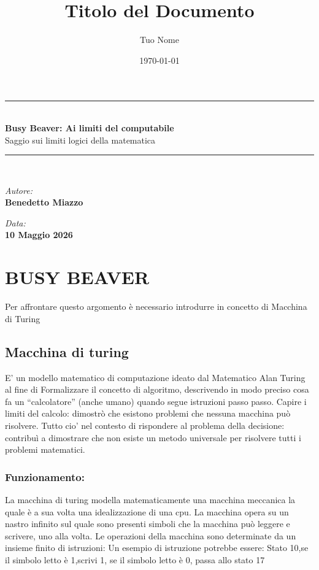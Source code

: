 \documentclass[12pt, a4paper, oneside]{article}
\begin{document}
\title{\textbf{Titolo del Documento}}
\author{Tuo Nome}
\date{\today}

\begin{center}
    \rule{\textwidth}{0.4pt} \\ [0.4cm]
    {\huge \bfseries Busy Beaver: Ai limiti del computabile} \\ [0.2cm]
    {\large Saggio sui limiti logici della matematica} \\ [0.2cm]
    \rule{\textwidth}{0.4pt} \\ [0.6cm]
    
    \begin{minipage}{0.45\textwidth}
        \begin{flushleft} \large
            \emph{Autore:}\\
            \textbf{Benedetto Miazzo}
        \end{flushleft}
    \end{minipage}
    \begin{minipage}{0.45\textwidth}
        \begin{flushright} \large
            \emph{Data:} \\
            \textbf{10 Maggio 2026}
        \end{flushright}
    \end{minipage}
\end{center}
\vspace{1cm}
\newpage
\section*{BUSY BEAVER}

Per affrontare questo argomento è necessario introdurre in concetto di Macchina di Turing

\subsection*{Macchina di turing}
E’ un modello matematico di computazione ideato dal Matematico Alan Turing al fine di Formalizzare il concetto di algoritmo,  descrivendo in modo preciso cosa fa un ``calcolatore'' (anche umano) quando segue istruzioni passo passo.
Capire i limiti del calcolo: dimostrò che esistono problemi che nessuna macchina può risolvere.
Tutto cio’ nel contesto di rispondere al problema della decisione: contribuì a dimostrare che non esiste un metodo universale per risolvere tutti i problemi matematici.

\subsubsection*{Funzionamento:}
La macchina di turing modella matematicamente una macchina meccanica la quale è a sua volta una idealizzazione di una cpu.
La macchina opera su un nastro infinito sul quale sono presenti simboli che la macchina può leggere e scrivere, uno alla volta.
Le operazioni della macchina sono determinate da un insieme finito di istruzioni:
\newline
Un esempio di istruzione potrebbe essere:
Stato 10,se il simbolo letto è 1,scrivi 1, se il simbolo letto è 0, passa allo stato 17
\end{document}
